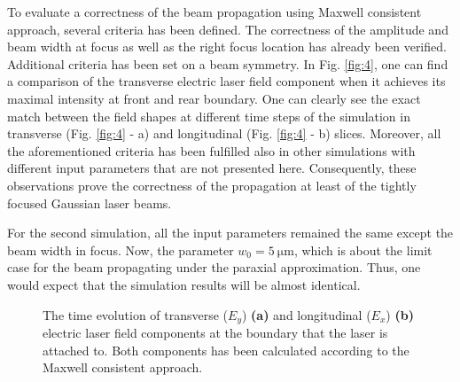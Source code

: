 To evaluate a correctness of the beam propagation using Maxwell consistent approach, several criteria has been defined. The correctness of the amplitude and beam width at focus as well as the right focus location has already been verified. Additional criteria has been set on a beam symmetry. In Fig. \ref{fig:4}, one can find a comparison of the transverse electric laser field component when it achieves its maximal intensity at front and rear boundary. One can clearly see the exact match between the field shapes at different time steps of the simulation in transverse (Fig. \ref{fig:4} - a) and longitudinal (Fig. \ref{fig:4} - b) slices. Moreover, all the aforementioned criteria has been fulfilled also in other simulations with different input parameters that are not presented here. Consequently, these observations prove the correctness of the propagation at least of the tightly focused Gaussian laser beams.

For the second simulation, all the input parameters remained the same except the beam width in focus. Now, the parameter $ w_0 = 5 \: \mathrm{\mu m} $, which is about the limit case for the beam propagating under the paraxial approximation. Thus, one would expect that the simulation results will be almost identical.

\begin{figure}[h!]
	\centering
	\hspace{2mm}
	\caption{The time evolution of transverse ($ E_{y} $) \textbf{(a)} and longitudinal ($ E_{x} $) \textbf{(b)} electric laser field components at the boundary that the laser is attached to. Both components has been calculated according to the Maxwell consistent approach.}
	\label{fig:3}
\end{figure}

